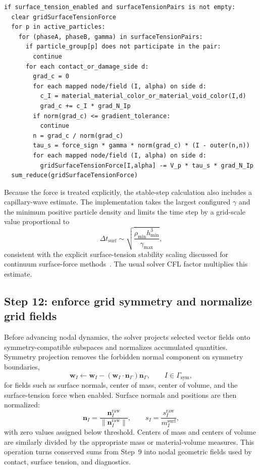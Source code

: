\begin{lstlisting}[caption={Surface-tension force assembly.},basicstyle=\ttfamily\small]
if surface_tension_enabled and surfaceTensionPairs is not empty:
  clear gridSurfaceTensionForce
  for p in active_particles:
    for (phaseA, phaseB, gamma) in surfaceTensionPairs:
      if particle_group[p] does not participate in the pair:
        continue
      for each contact_or_damage_side d:
        grad_c = 0
        for each mapped node/field (I, alpha) on side d:
          c_I = material_material_color_or_material_void_color(I,d)
          grad_c += c_I * grad_N_Ip
        if norm(grad_c) <= gradient_tolerance:
          continue
        n = grad_c / norm(grad_c)
        tau_s = force_sign * gamma * norm(grad_c) * (I - outer(n,n))
        for each mapped node/field (I, alpha) on side d:
          gridSurfaceTensionForce[I,alpha] -= V_p * tau_s * grad_N_Ip
  sum_reduce(gridSurfaceTensionForce)
\end{lstlisting}

Because the force is treated explicitly, the stable-step calculation also includes a capillary-wave estimate.  The implementation takes the largest configured $\gamma$ and the minimum positive particle density and limits the time step by a grid-scale value proportional to
\begin{equation}
  \Delta t_{\mathrm{surf}}
  \sim \sqrt{\frac{\rho_{\min} h_{\min}^{3}}{\gamma_{\max}}},
\end{equation}
consistent with the explicit surface-tension stability scaling discussed for continuum surface-force methods~\cite{brackbill1992csf}.  The usual solver CFL factor multiplies this estimate.

\subsection{Step 12: enforce grid symmetry and normalize grid fields}
\label{subsec:solver-step-12}
Before advancing nodal dynamics, the solver projects selected vector fields onto symmetry-compatible subspaces and normalizes accumulated quantities.  Symmetry projection removes the forbidden normal component on symmetry boundaries,
\begin{equation}
  \mathbf{w}_I \leftarrow \mathbf{w}_I - (\mathbf{w}_I\cdot\mathbf{n}_{\Gamma})\mathbf{n}_{\Gamma},
  \qquad I\in\Gamma_{\mathrm{sym}},
\end{equation}
for fields such as surface normals, center of mass, center of volume, and the surface-tension force when enabled.  Surface normals and positions are then normalized:
\begin{equation}
  \mathbf{n}_I = \frac{\mathbf{n}^{\mathrm{raw}}_I}{\|\mathbf{n}^{\mathrm{raw}}_I\|},
  \qquad
  s_I = \frac{s^{\mathrm{raw}}_I}{m^{\mathrm{surf}}_I},
\end{equation}
with zero values assigned below threshold.  Centers of mass and centers of volume are similarly divided by the appropriate mass or material-volume measures.  This operation turns conserved sums from Step~9 into nodal geometric fields used by contact, surface tension, and diagnostics.

